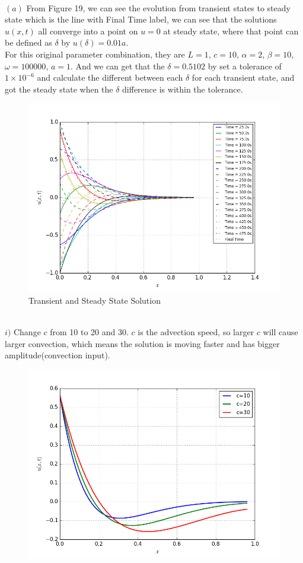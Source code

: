 \documentclass[12pt]{article}
\newenvironment{problem}[2][Problem]{\begin{trivlist}
\item[\hskip \labelsep {\bfseries #1}\hskip \labelsep {\bfseries #2.}]}{\end{trivlist}}
\begin{document}
\begin{problem}{3}
\text{}\\
$(a)$ From Figure 19, we can see the evolution from transient states to steady state which is the line with Final Time label, we can see that the solutions $u(x,t)$ all converge into a point on $u=0$ at steady state, where that point can be defined as $\delta$ by $u(\delta) = 0.01a$.\\
For this original parameter combination, they are $L = 1$, $c=10$, $\alpha=2$, $\beta=10$, $\omega=100000$, $a=1$. And we can get that the $\delta = 0.5102$ by set a tolerance of $1 \times 10^{-6}$ and calculate the different between each $\delta$ for each transient state, and got the steady state when the $\delta$ difference is within the tolerance.\\
\begin{figure}[H]
\centering
  \includegraphics[scale=0.5]{p3a_ss.png}
 \caption{Transient and Steady State Solution}
\label{label}
\end{figure}
\text{}\\
$i)$ Change $c$ from 10 to 20 and 30. $c$ is the advection speed, so larger $c$ will cause larger convection, which means the solution is moving faster and has bigger amplitude(convection input).\\
\begin{figure}[H]
\centering
  \includegraphics[scale=0.6]{p3a_change_c.png}

\end{figure}
\end{problem}
\end{document}
